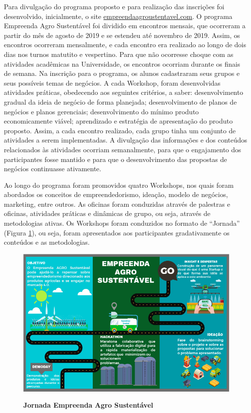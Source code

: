 Para divulgação do programa proposto e para realização das inscrições foi desenvolvido, inicialmente, o site \href{http://www.empreendaagrosustentavel.com}{empreendaagroustentavel.com}.
O programa Empreenda Agro Sustentável foi dividido em encontros mensais, que ocorreram a partir do mês de agosto de 2019 e se estendeu até novembro de 2019. Assim, os encontros ocorreram mensalmente, e cada encontro era realizado ao longo de dois dias nos turnos matutito e vespertino. Para que não ocorresse choque com as atividades acadêmicas na Universidade, os encontros ocorriam durante os finais de semana. Na inscrição para o programa, os alunos cadastraram seus grupos e seus possíveis temas de negócios. 
A cada Workshop, foram desenvolvidas atividades práticas, obedecendo aos seguintes critérios, a saber: desenvolvimento gradual da ideia de negócio de forma planejada; desenvolvimento de planos de negócios e planos gerenciais; desenvolvimento do mínimo produto economicamente viável; aprendizado e estratégia de apresentação do produto proposto.
Assim, a cada encontro realizado, cada grupo tinha um conjunto de atividades a serem implementadas. A divulgação das informações e dos conteúdos relacionados às atividades ocorriam semanalmente, para que o engajamento dos participantes fosse mantido e para que o desenvolvimento das propostas de negócios continuasse ativamente. 

Ao longo do programa foram promovidos quatro Workshops, nos quais foram abordados os conceitos de empreendedorismo, ideação, modelo de negócios, marketing, entre outros. As oficinas foram conduzidas através de palestras e oficinas, atividades práticas e dinâmicas de grupo, ou seja, através de metodologias ativas. Os Workshops foram conduzidos no formato de “Jornada” (Figura \ref{figura_17}), ou seja, foram apresentados aos participantes gradativamente os conteúdos e as metodologias.

\begin{figure}[H]
\centering
\caption{\textbf{Jornada Empreenda Agro Sustentável}}
\includegraphics[scale=0.5]{Imagens/jornada.png}
\label{figura_17}
\end{figure}

